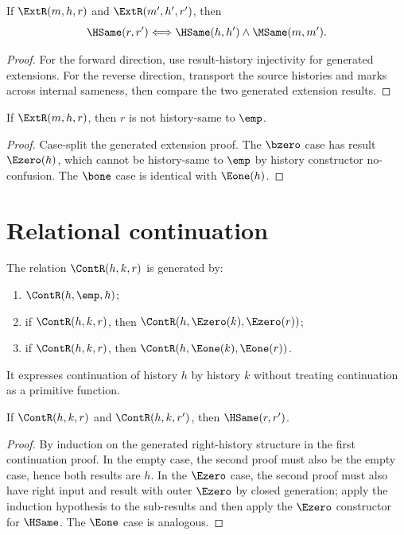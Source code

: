 \begin{theorem}
\label{thm:extension-result-source-mark-iff}
If $\ExtR(m,h,r)$ and $\ExtR(m',h',r')$, then
$$
\HSame(r,r')
\Longleftrightarrow
\HSame(h,h')\land\MSame(m,m').
$$
\end{theorem}
\begin{proof}
For the forward direction, use result-history injectivity for generated
extensions. For the reverse direction, transport the source histories and
marks across internal sameness, then compare the two generated extension
results.
\end{proof}

\begin{theorem}
\label{thm:ext-result-ne-empty}
If $\ExtR(m,h,r)$, then $r$ is not history-same to $\emp$.
\end{theorem}
\begin{proof}
Case-split the generated extension proof. The $\bzero$ case has result
$\Ezero(h)$, which cannot be history-same to $\emp$ by history constructor
no-confusion. The $\bone$ case is identical with $\Eone(h)$.
\end{proof}

\section{Relational continuation}

\begin{definition}
The relation $\ContR(h,k,r)$ is generated by:
\begin{enumerate}
  \item $\ContR(h,\emp,h)$;
  \item if $\ContR(h,k,r)$, then $\ContR(h,\Ezero(k),\Ezero(r))$;
  \item if $\ContR(h,k,r)$, then $\ContR(h,\Eone(k),\Eone(r))$.
\end{enumerate}
It expresses continuation of history $h$ by history $k$ without treating continuation as a primitive function.
\end{definition}

\begin{theorem}
\label{thm:continuation-determinacy-up-to-history-sameness}
If \(\ContR(h,k,r)\) and \(\ContR(h,k,r')\), then \(\HSame(r,r')\).
\end{theorem}
\begin{proof}
By induction on the generated right-history structure in the first continuation proof. In the empty case, the second proof must also be the empty case, hence both results are $h$. In the $\Ezero$ case, the second proof must also have right input and result with outer $\Ezero$ by closed generation; apply the induction hypothesis to the sub-results and then apply the $\Ezero$ constructor for $\HSame$. The $\Eone$ case is analogous.
\end{proof}

